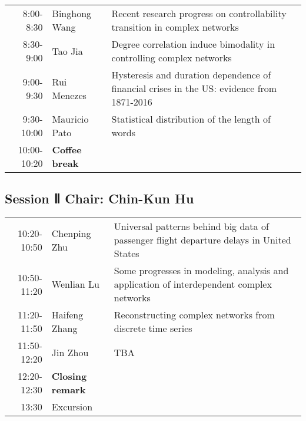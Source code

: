 \documentclass[11pt]{article}
\begin{document}
\begin{center}
\begin{tabular}{rll}
\hline
8:00-8:30 & Binghong Wang & Recent research progress on controllability transition in complex networks\\
8:30-9:00 & Tao Jia & Degree correlation induce bimodality in controlling complex networks\\
9:00-9:30 & Rui Menezes & Hysteresis and duration dependence of financial crises in the US: evidence from 1871-2016\\
9:30-10:00 & Mauricio Pato & Statistical distribution of the length of words\\
10:00-10:20 &  \textbf{Coffee break} & \\
\hline
\end{tabular}
\end{center}


\subsection*{Session Ⅱ Chair: Chin-Kun Hu}
\label{sec:orgfe03dee}

\begin{center}
\begin{tabular}{rll}
\hline
10:20-10:50 & Chenping Zhu & Universal patterns behind big data of passenger flight departure delays in United States\\
10:50-11:20 & Wenlian Lu & Some progresses in modeling, analysis and application of interdependent complex networks\\
11:20-11:50 & Haifeng Zhang & Reconstructing complex networks from discrete time series\\
11:50-12:20 & Jin Zhou & TBA\\
\cellcolor{red!25} 12:20-12:30 & \cellcolor{red!25} \textbf{Closing remark} & \cellcolor{red!25}\\
13:30 & Excursion & \\
\hline
\end{tabular}
\end{center}
\end{document}
